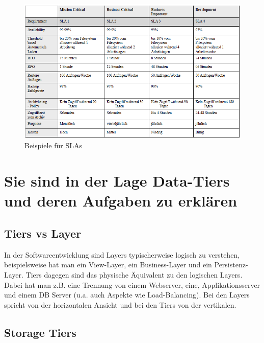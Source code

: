 \begin{figure}[h!]
	\centering
	\includegraphics[width=0.9\linewidth]{fig/sla}
	\caption{Beispiele für SLAs}
	\label{fig:sla_beispiele}
\end{figure}

\section{Sie sind in der Lage Data-Tiers und deren Aufgaben zu erklären}

\subsection{Tiers vs Layer}
In der Softwareentwicklung sind Layers typischerweise logisch zu verstehen, beispielsweise hat man ein View-Layer, ein Business-Layer und ein Persistenz-Layer. Tiers dagegen sind das physische Äquivalent zu den logischen Layers. Dabei hat man z.B. eine Trennung von einem Webserver, eine, Applikationsserver und einem DB Server (u.a. auch Aspekte wie Load-Balancing). Bei den Layers spricht von der horizontalen Ansicht und bei den Tiers von der vertikalen.

\newpage

\subsection{Storage Tiers}\label{sec:storagetier}

